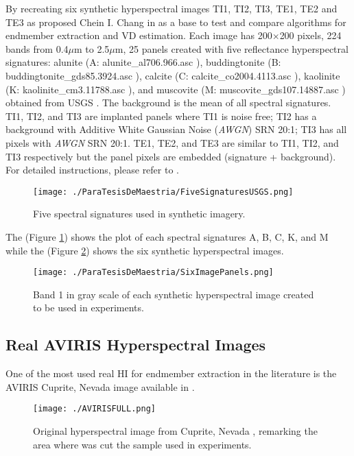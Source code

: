 \documentclass[11pt, oneside]{Thesis} %
\begin{document}
By recreating six synthetic hyperspectral images TI1, TI2, TI3, TE1, TE2 and TE3 as 
proposed Chein I. Chang in \cite{ChangBig2013} as a base to test and compare 
algorithms for endmember extraction and VD estimation. Each image has 200$\times$200 
pixels, 224 bands from 0.4$\mu$m to 2.5$\mu$m, 25 panels created with five 
reflectance hyperspectral signatures: alunite (A: alunite\_al706.966.asc \cite{USGS}), 
buddingtonite (B: buddingtonite\_gds85.3924.asc \cite{USGS}), calcite 
(C: calcite\_co2004.4113.asc \cite{USGS}), kaolinite (K: kaolinite\_cm3.11788.asc 
\cite{USGS}), and muscovite (M: muscovite\_gds107.14887.asc \cite{USGS}) obtained from 
USGS \cite{USGS}. The background is the mean of all spectral signatures. TI1, TI2, and 
TI3 are implanted panels where TI1 is noise free; TI2 has a background with Additive 
White Gaussian Noise (\emph{AWGN}) SRN 20:1; TI3 has all pixels with \emph{AWGN} SRN 
20:1. TE1, TE2, and TE3 are similar to TI1, TI2, and TI3 respectively but the panel 
pixels are embedded (signature + background). For detailed instructions, please refer 
to \cite{ChangBig2013}. \\
  \begin{figure}[ht]
    \centering
    \texttt{[image: ./ParaTesisDeMaestria/FiveSignaturesUSGS.png]}
    \centering
    \caption{Five spectral signatures used in synthetic imagery.}
    \label{FigureFiveSpectralSignatures}
  \end{figure}	

The (Figure \ref{FigureFiveSpectralSignatures}) shows the plot of each spectral 
signatures A, B, C, K, and M while the (Figure \ref{FigureSixImagePanels}) shows 
the six synthetic hyperspectral images.

\begin{figure}[ht]
  \centering
  \texttt{[image: ./ParaTesisDeMaestria/SixImagePanels.png]}
  \centering
  \caption{Band 1 in gray scale of each synthetic hyperspectral image created to 
  be used in experiments.}
  \label{FigureSixImagePanels}
\end{figure}

\subsection{Real AVIRIS Hyperspectral Images}
One of the most used real HI for endmember extraction in the literature is 
the AVIRIS Cuprite, Nevada image available in \cite{AVIRIS}.

\begin{figure}[ht]
  \centering
  \texttt{[image: ./AVIRISFULL.png]}
  \centering
  \caption{Original hyperspectral image from Cuprite, Nevada \cite{AVIRIS}, 
  remarking the area where was cut the sample used in experiments.}
  \label{AVIRISCUPRITENEVADAFULL}
\end{figure}
\end{document}
